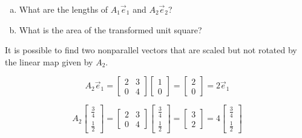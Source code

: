 \begin{applicationActivities}
\begin{activity}{5}
\begin{enumerate}[(a)]
\item What are the lengths of \(A_1\vec e_1\) and \(A_2\vec e_2\)?
\item What is the area of the transformed unit square?
\end{enumerate}
\end{activity}

\begin{observation}
  It is possible to find two nonparallel vectors that are scaled but not rotated by
  the linear map given by \(A_2\).

\begin{multicols}{2}
  \[A_2\vec e_1=\begin{bmatrix} 2 & 3 \\ 0 & 4 \end{bmatrix}\begin{bmatrix}1\\0\end{bmatrix}
  =\begin{bmatrix}2\\0\end{bmatrix}=2\vec e_1\]

  \[
    A_2\begin{bmatrix}\frac{3}{4}\\\frac{1}{2}\end{bmatrix}
      =
    \begin{bmatrix} 2 & 3 \\ 0 & 4 \end{bmatrix}\begin{bmatrix}\frac{3}{4}\\\frac{1}{2}\end{bmatrix}
      =
    \begin{bmatrix}3\\2\end{bmatrix}
      =
    4\begin{bmatrix}\frac{3}{4}\\\frac{1}{2}\end{bmatrix}
  \]

\columnbreak


\end{multicols}
\end{observation}
\end{applicationActivities}
